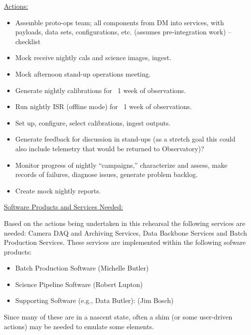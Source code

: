 \clearpage

\underline{Actions:}

\begin{itemize}
\item Assemble proto-ops team; all components from DM into services, with payloads, data sets, configurations, etc. (assumes pre-integration work) -- checklist
\item Mock receive nightly cals and science images, ingest.
\item Mock afternoon stand-up operations meeting.
\item Generate nightly calibrations for ~1 week of observations.
\item Run nightly ISR (offline mode) for ~1 week of observations.
\item Set up, configure, select calibrations, ingest outputs.
\item Generate feedback for discussion in stand-ups (as a stretch goal this could also include telemetry that would be returned to Observatory)?
\item Monitor progress of nightly “campaigns,” characterize and assess, make records of failures, diagnose issues, generate problem backlog.
\item Create mock nightly reports.
\end{itemize}


\underline{Software Products and Services Needed:}

Based on the actions being undertaken in this rehearsal the following services are needed: 
Camera DAQ and Archiving Services, Data Backbone Services and Batch Production Services.   
These services are implemented within the following sofware products:
\begin{itemize}
\item Batch Production Software (Michelle Butler)
\item Science Pipeline Software (Robert Lupton)
\item Supporting Software (e.g., Data Butler): (Jim Bosch)
\end{itemize}
Since many of these are in a nascent state, often a shim (or some user-driven actions) 
may be needed to emulate some elements.


